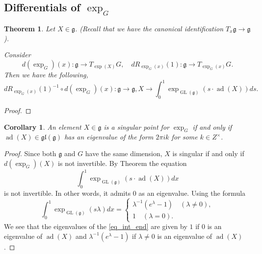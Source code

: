 \documentclass{article}
\newtheorem{theorem}{Theorem}[section]
\newtheorem{corollary}{Corollary}[section]
\numberwithin{equation}{section}
\DeclareMathOperator{\ad}{ad}
\DeclareMathOperator{\GL}{GL}
\begin{document}
\subsection{Differentials of $\exp_G$}

\begin{theorem}
Let $X\in\mathfrak{g}$. (Recall that we have the canonical identification $T_x\mathfrak{g}\to\mathfrak{g}$).\\
\par Consider 
\begin{equation*}
d(\exp_G)(x):\mathfrak{g}\to T_{\exp(X)}G,\quad dR_{\exp_G(x)}(1):\mathfrak{g}\to T_{\exp_G(x)}G.
\end{equation*}
Then we have the following,
\begin{equation*}
dR_{\exp_G(x)}(1)^{-1}\circ d(\exp_G)(x):\mathfrak{g}\to\mathfrak{g}, X\to\int_0^1\exp_{\GL(\mathfrak{g})}(s\cdot\ad(X))ds.
\end{equation*} 
\label{g_end_int}
\end{theorem}

\begin{proof}
\end{proof}

\begin{corollary}
An element $X\in\mathfrak{g}$ is a singular point for $\exp_G$ if and only if $\ad(X)\in\mathfrak{gl}(\mathfrak{g})$ has an eigenvalue of the form $2\pi ik$ for some $k\in Z^{\times}$. 
\label{sing_lie_alg}
\end{corollary}

\begin{proof}
Since both $\mathfrak{g}$ and $G$ have the same dimension, $X$ is singular if and only if $d(\exp_G)(X)$ is not invertible. By Theorem %
the equation
\begin{equation}
\int_0^1\exp_{\GL(\mathfrak{g})}(s\cdot\ad(X))dx
\label{eq_int_end}
\end{equation}
is not invertible. In other words, it admits $0$ as an eigenvalue. Using the formula
\begin{equation*}
\int_0^1\exp_{\GL(\mathfrak{g})}(s\lambda)dx = 
\begin{cases}
\lambda^{-1}(e^{\lambda}-1)\quad(\lambda\not=0),\\
1\quad(\lambda=0).
\end{cases}
\end{equation*}
We see that the eigenvalues of the \eqref{eq_int_end} are given by $1$ if $0$ is an eigenvalue of $\ad(X)$ and $\lambda^{-1}(e^\lambda-1)$ if $\lambda\not=0$ is an eigenvalue of $\ad(X)$.
\end{proof}
\end{document}
